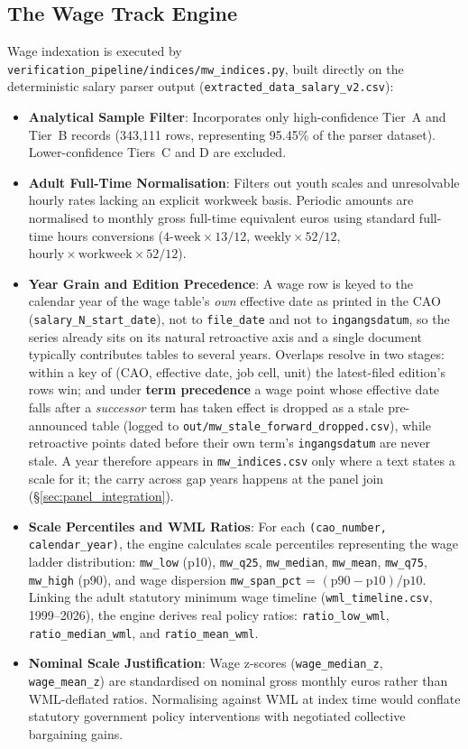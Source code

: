 \subsection{The Wage Track Engine}
\label{sec:wage_engine}

Wage indexation is executed by \nolinkurl{verification_pipeline/indices/mw_indices.py}, built directly on the deterministic salary parser output (\nolinkurl{extracted_data_salary_v2.csv}):
\begin{itemize}[leftmargin=1.5em]
  \item \textbf{Analytical Sample Filter}: Incorporates only high-confidence Tier~A and Tier~B records (343,111 rows, representing 95.45\% of the parser dataset). Lower-confidence Tiers~C and D are excluded.
  \item \textbf{Adult Full-Time Normalisation}: Filters out youth scales and unresolvable hourly rates lacking an explicit workweek basis. Periodic amounts are normalised to monthly gross full-time equivalent euros using standard full-time hours conversions ($4\text{-week} \times 13/12$, $\text{weekly} \times 52/12$, $\text{hourly} \times \text{workweek} \times 52/12$).
  \item \textbf{Year Grain and Edition Precedence}: A wage row is keyed to the calendar year of the wage table's \emph{own} effective date as printed in the CAO (\nolinkurl{salary_N_start_date}), not to \nolinkurl{file_date} and not to \nolinkurl{ingangsdatum}, so the series already sits on its natural retroactive axis and a single document typically contributes tables to several years. Overlaps resolve in two stages: within a key of (CAO, effective date, job cell, unit) the latest-filed edition's rows win; and under \textbf{term precedence} a wage point whose effective date falls after a \emph{successor} term has taken effect is dropped as a stale pre-announced table (logged to \nolinkurl{out/mw_stale_forward_dropped.csv}), while retroactive points dated before their own term's \nolinkurl{ingangsdatum} are never stale. A year therefore appears in \nolinkurl{mw_indices.csv} only where a text states a scale for it; the carry across gap years happens at the panel join (\S\ref{sec:panel_integration}).
  \item \textbf{Scale Percentiles and WML Ratios}: For each \nolinkurl{(cao_number, calendar_year)}, the engine calculates scale percentiles representing the wage ladder distribution: \nolinkurl{mw_low} (p10), \nolinkurl{mw_q25}, \nolinkurl{mw_median}, \nolinkurl{mw_mean}, \nolinkurl{mw_q75}, \nolinkurl{mw_high} (p90), and wage dispersion \nolinkurl{mw_span_pct} = $(\text{p90} - \text{p10})/\text{p10}$. Linking the adult statutory minimum wage timeline (\nolinkurl{wml_timeline.csv}, 1999--2026), the engine derives real policy ratios: \nolinkurl{ratio_low_wml}, \nolinkurl{ratio_median_wml}, and \nolinkurl{ratio_mean_wml}.
  \item \textbf{Nominal Scale Justification}: Wage z-scores (\nolinkurl{wage_median_z}, \nolinkurl{wage_mean_z}) are standardised on nominal gross monthly euros rather than WML-deflated ratios. Normalising against WML at index time would conflate statutory government policy interventions with negotiated collective bargaining gains.
\end{itemize}

